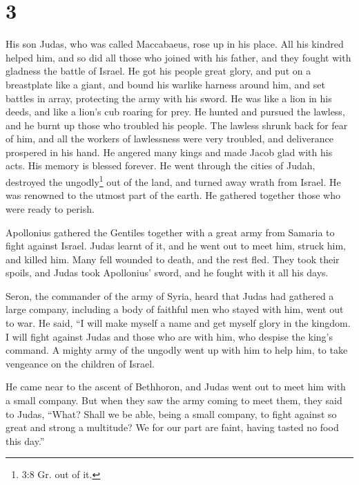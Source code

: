 \hypertarget{section-2}{%
\section{3}\label{section-2}}

 His son Judas, who was called Maccabaeus, rose up in his
place.  All his kindred helped him, and so did all those who
joined with his father, and they fought with gladness the battle of
Israel.  He got his people great glory, and put on a
breastplate like a giant, and bound his warlike harness around him, and
set battles in array, protecting the army with his sword. 
He was like a lion in his deeds, and like a lion's cub roaring for prey.
 He hunted and pursued the lawless, and he burnt up those
who troubled his people.  The lawless shrunk back for fear
of him, and all the workers of lawlessness were very troubled, and
deliverance prospered in his hand.  He angered many kings
and made Jacob glad with his acts. His memory is blessed forever.
 He went through the cities of Judah, destroyed the
ungodly\footnote{3:8 Gr. out of it.} out of the land, and turned away
wrath from Israel.  He was renowned to the utmost part of
the earth. He gathered together those who were ready to perish.

 Apollonius gathered the Gentiles together with a great
army from Samaria to fight against Israel.  Judas learnt of
it, and he went out to meet him, struck him, and killed him. Many fell
wounded to death, and the rest fled.  They took their
spoils, and Judas took Apollonius' sword, and he fought with it all his
days.

 Seron, the commander of the army of Syria, heard that
Judas had gathered a large company, including a body of faithful men who
stayed with him, went out to war.  He said, ``I will make
myself a name and get myself glory in the kingdom. I will fight against
Judas and those who are with him, who despise the king's command.
 A mighty army of the ungodly went up with him to help him,
to take vengeance on the children of Israel.

 He came near to the ascent of Bethhoron, and Judas went
out to meet him with a small company.  But when they saw
the army coming to meet them, they said to Judas, ``What? Shall we be
able, being a small company, to fight against so great and strong a
multitude? We for our part are faint, having tasted no food this day.''

